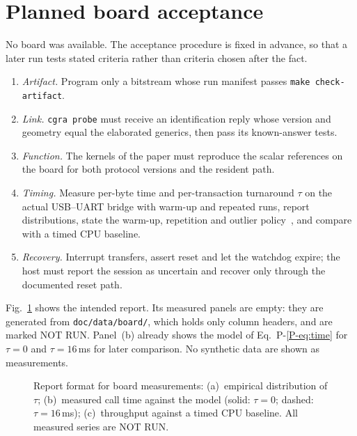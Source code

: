 \section{Planned board acceptance}
\label{sec:board-plan}

No board was available. The acceptance procedure is fixed in advance, so
that a later run tests stated criteria rather than criteria chosen after the
fact.
\begin{enumerate}
  \item \emph{Artifact.} Program only a bitstream whose run manifest passes
        \texttt{make check-artifact}.
  \item \emph{Link.} \texttt{cgra probe} must receive an identification
        reply whose version and geometry equal the elaborated generics, then
        pass its known-answer tests.
  \item \emph{Function.} The kernels of the paper must reproduce the scalar
        references on the board for both protocol versions and the resident
        path.
  \item \emph{Timing.} Measure per-byte time and per-transaction turnaround
        $\tau$ on the actual USB--UART bridge with warm-up and repeated runs,
        report distributions, state the warm-up, repetition and outlier
        policy~\cite{hoefler-benchmarking}, and compare with a timed CPU
        baseline.
  \item \emph{Recovery.} Interrupt transfers, assert reset and let the
        watchdog expire; the host must report the session as uncertain and
        recover only through the documented reset path.
\end{enumerate}
Fig.~\ref{fig:board} shows the intended report. Its measured panels are
empty: they are generated from \texttt{doc/data/board/}, which holds only
column headers, and are marked NOT RUN. Panel~(b) already shows the model of
Eq.~P-\ref{P-eq:time} for $\tau=0$ and $\tau=16$\,ms for later comparison.
No synthetic data are shown as measurements.

\begin{figure}[t]
  \centering
  \resizebox{\textwidth}{!}{}
  \caption{Report format for board measurements: (a)~empirical
  distribution of $\tau$; (b)~measured call time against the model
  (solid: $\tau=0$; dashed: $\tau=16$\,ms); (c)~throughput against a timed CPU
  baseline. All measured series are NOT RUN.}
  \label{fig:board}
\end{figure}
